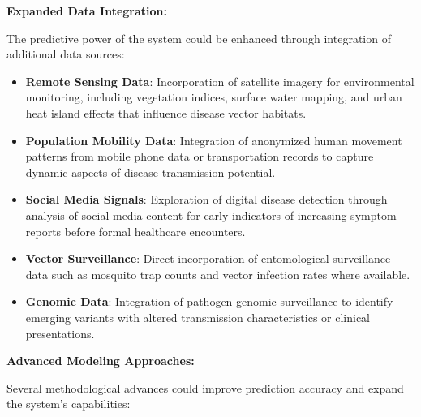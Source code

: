 \documentclass[12pt,a4paper]{report}
\begin{document}
\textbf{Expanded Data Integration:}

The predictive power of the system could be enhanced through integration of additional data sources:

\begin{itemize}
    \item \textbf{Remote Sensing Data}: Incorporation of satellite imagery for environmental monitoring, including vegetation indices, surface water mapping, and urban heat island effects that influence disease vector habitats.
    
    \item \textbf{Population Mobility Data}: Integration of anonymized human movement patterns from mobile phone data or transportation records to capture dynamic aspects of disease transmission potential.
    
    \item \textbf{Social Media Signals}: Exploration of digital disease detection through analysis of social media content for early indicators of increasing symptom reports before formal healthcare encounters.
    
    \item \textbf{Vector Surveillance}: Direct incorporation of entomological surveillance data such as mosquito trap counts and vector infection rates where available.
    
    \item \textbf{Genomic Data}: Integration of pathogen genomic surveillance to identify emerging variants with altered transmission characteristics or clinical presentations.
\end{itemize}

\textbf{Advanced Modeling Approaches:}

Several methodological advances could improve prediction accuracy and expand the system's capabilities:
\end{document}
